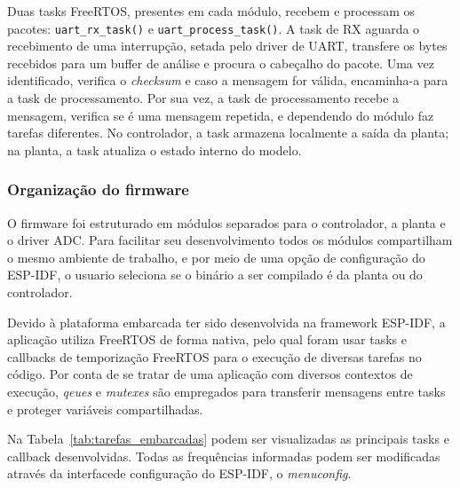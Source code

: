 Duas tasks FreeRTOS, presentes em cada módulo, recebem e processam os pacotes: \texttt{uart\_rx\_task()} e \texttt{uart\_process\_task()}. A task de RX aguarda o recebimento de uma interrupção, setada pelo driver de UART, transfere os bytes recebidos para um buffer de análise e procura o cabeçalho do pacote. Uma vez identificado, verifica o \textit{checksum} e caso a mensagem for válida, encaminha-a para a task de processamento. Por sua vez, a task de processamento recebe a mensagem, verifica se é uma mensagem repetida, e dependendo do módulo faz tarefas diferentes. No controlador, a task armazena localmente a saída da planta; na planta, a task atualiza o estado interno do modelo.

\subsubsection{Organização do firmware}

O firmware foi estruturado em módulos separados para o controlador, a planta e o driver ADC. Para facilitar seu desenvolvimento todos os módulos compartilham o mesmo ambiente de trabalho, e por meio de uma opção de configuração do ESP-IDF, o usuario seleciona se o binário a ser compilado é da planta ou do controlador.

Devido à plataforma embarcada ter sido desenvolvida na framework ESP-IDF, a aplicação utiliza FreeRTOS de forma nativa, pelo qual foram usar tasks e callbacks de temporização FreeRTOS para o execução de diversas tarefas no código. Por conta de se tratar de uma aplicação com diversos contextos de execução, \textit{qeues} e \textit{mutexes} são empregados para transferir mensagens entre tasks e proteger variáveis compartilhadas.

Na Tabela~\ref{tab:tarefas_embarcadas} podem ser visualizadas as principais tasks e callback desenvolvidas. Todas as frequências informadas podem ser modificadas através da interfacede configuração do ESP-IDF, o \textit{menuconfig}.


